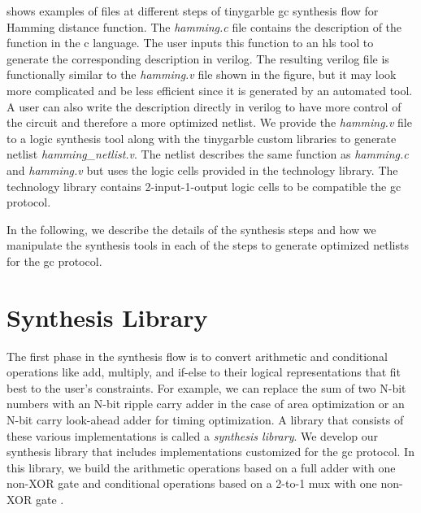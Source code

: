  shows examples of files at different steps of \gls{tinygarble} \acrshort{gc} synthesis flow for Hamming distance function.
The \textsl{hamming.c} file contains the description of the function in the \gls{c} language.
The user inputs this function to an \acrshort{hls} tool to generate the corresponding description in \gls{verilog}.
The resulting \gls{verilog} file is functionally similar to the \textsl{hamming.v} file shown in the figure, but it may look more complicated and be less efficient since it is generated by an automated tool.
A user can also write the description directly in \gls{verilog} to have more control of the circuit and therefore a more optimized \gls{netlist}.
We provide the \textsl{hamming.v} file to a logic synthesis tool along with the \gls{tinygarble} custom libraries to generate \gls{netlist} \textsl{hamming\_netlist.v}.
The \gls{netlist} describes the same function as \textsl{hamming.c} and \textsl{hamming.v} but uses the logic cells provided in the technology library.
The technology library contains 2-input-1-output logic cells to be compatible the \acrshort{gc} protocol.

In the following, we describe the details of the synthesis steps and how we manipulate the synthesis tools in each of the steps to generate optimized \gls{netlist}s for the \acrshort{gc} protocol.

\section{Synthesis Library}\label{sec:syn-synlib}
The first phase in the synthesis flow is to convert arithmetic and conditional operations like add, multiply, and if-else to their logical representations that fit best to the user's constraints.
For example, we can replace the sum of two N-bit numbers with an N-bit ripple carry adder in the case of area optimization or an N-bit carry look-ahead adder for timing optimization.
A library that consists of these various implementations is called a \emph{synthesis library}.
We develop our synthesis library that includes implementations customized for the \acrshort{gc} protocol.
In this library, we build the arithmetic operations based on a full adder with one non-XOR gate \cite{boyar2006concrete} and conditional operations based on a 2-to-1 \acrfull{mux} with one non-XOR gate \cite{kolesnikov2008improved}.

